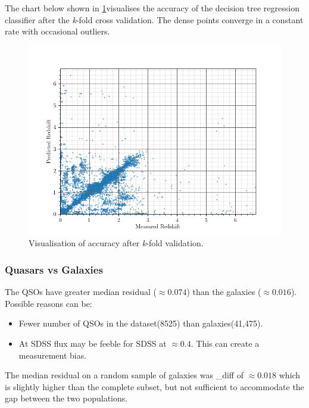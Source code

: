 The chart below shown in \ref{fig:kch}visualises the accuracy of the decision tree regression classifier after the \textit{k}-fold cross validation. The dense points converge in a constant rate with occasional outliers.
\begin{figure}[H]
	\centering
	\includegraphics[width=\linewidth,keepaspectratio]{images/misc/k_fold_v.png}
	\caption{Visualisation of accuracy after \textit{k}-fold validation.}
	\label{fig:kch}
\end{figure}

\subsubsection{Quasars vs Galaxies}
The QSOs have greater median residual ($\approx0.074$) than the galaxies ($\approx0.016$). Possible reasons can be:
\begin{itemize}
	\item Fewer number of QSOs in the dataset(8525) than galaxies(41,475). 
	\item At SDSS flux may be feeble for SDSS at $\approx0.4$. This can create a measurement bias.
\end{itemize}
The median residual on a random sample of galaxies was \_diff of $\approx0.018$ which is slightly higher than the complete subset, but not sufficient to accommodate the gap between the two populations.

